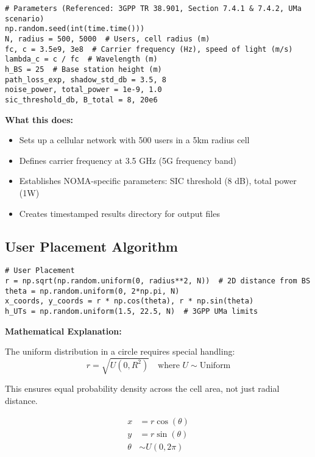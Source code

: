 \documentclass[11pt,a4paper]{article}
\begin{document}
\begin{lstlisting}[caption={System Parameters Setup}]
# Parameters (Referenced: 3GPP TR 38.901, Section 7.4.1 & 7.4.2, UMa scenario)
np.random.seed(int(time.time()))
N, radius = 500, 5000  # Users, cell radius (m)
fc, c = 3.5e9, 3e8  # Carrier frequency (Hz), speed of light (m/s)
lambda_c = c / fc  # Wavelength (m)
h_BS = 25  # Base station height (m)
path_loss_exp, shadow_std_db = 3.5, 8
noise_power, total_power = 1e-9, 1.0
sic_threshold_db, B_total = 8, 20e6
\end{lstlisting}

\textbf{What this does:}
\begin{itemize}
    \item Sets up a cellular network with 500 users in a 5km radius cell
    \item Defines carrier frequency at 3.5 GHz (5G frequency band)
    \item Establishes NOMA-specific parameters: SIC threshold (8 dB), total power (1W)
    \item Creates timestamped results directory for output files
\end{itemize}

\subsection{User Placement Algorithm}

\begin{lstlisting}[caption={Uniform User Distribution}]
# User Placement
r = np.sqrt(np.random.uniform(0, radius**2, N))  # 2D distance from BS
theta = np.random.uniform(0, 2*np.pi, N)
x_coords, y_coords = r * np.cos(theta), r * np.sin(theta)
h_UTs = np.random.uniform(1.5, 22.5, N)  # 3GPP UMa limits
\end{lstlisting}

\textbf{Mathematical Explanation:}

The uniform distribution in a circle requires special handling:
\begin{equation}
r = \sqrt{U(0, R^2)} \quad \text{where } U \sim \text{Uniform}
\end{equation}

This ensures equal probability density across the cell area, not just radial distance.

\begin{equation}
\begin{aligned}
x &= r \cos(\theta) \\
y &= r \sin(\theta) \\
\theta &\sim U(0, 2\pi)
\end{aligned}
\end{equation}
\end{document}
